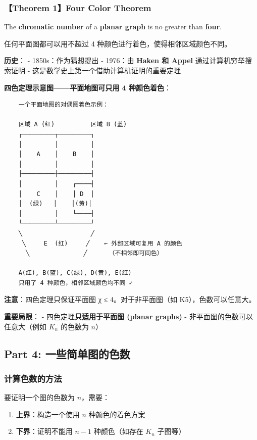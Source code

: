 \documentclass[10pt,a4paper,openany]{ctexbook}
\theoremstyle{definition}
\theoremstyle{remark}
\renewenvironment{quote}
  {\list{}{\leftmargin=1em\rightmargin=0pt\topsep=0.5pt\partopsep=0pt}\item[]}
  {\endlist}
\begin{document}
\subsubsection{【Theorem 1】Four Color Theorem}

\begin{quote}
The \textbf{chromatic number} of a \textbf{planar graph} is no greater than \textbf{four}.

任何平面图都可以用不超过 4 种颜色进行着色，使得相邻区域颜色不同。

\textbf{历史}：
- 1850s：作为猜想提出
- 1976：由 \textbf{Haken 和 Appel} 通过计算机穷举搜索证明
- 这是数学史上第一个借助计算机证明的重要定理

\textbf{四色定理示意图——平面地图可只用 4 种颜色着色}：

{\footnotesize\begin{verbatim}
    一个平面地图的对偶图着色示例：
    
    区域 A (红)          区域 B (蓝)
    ┌─────────┬─────────┐
    │         │         │
    │    A    │    B    │
    │         │         │
    ├─────────┼─────────┤
    │         │    ┌────┤
    │    C    │    │ D  │
    │  (绿)   │    │(黄)│
    │         │    └────┤
    └─────────┴─────────┘
    ╲                   ╱
     ╲     E  (红)     ╱    ← 外部区域可复用 A 的颜色
      ╲               ╱      （不相邻即可同色）
    
    A(红), B(蓝), C(绿), D(黄), E(红)
    只用了 4 种颜色，相邻区域颜色均不同 ✓
\end{verbatim}}


\textbf{注意}：四色定理只保证平面图 χ ≤ 4。对于非平面图（如 K5），色数可以任意大。

\textbf{重要局限}：
- 四色定理\textbf{只适用于平面图 (planar graphs)}
- 非平面图的色数可以任意大（例如 $K_n$ 的色数为 $n$）

\end{quote}
\vspace{-2pt}

\subsection{Part 4: 一些简单图的色数}

\subsubsection{计算色数的方法}

要证明一个图的色数为 $n$，需要：
\begin{enumerate}
\item \textbf{上界}：构造一个使用 $n$ 种颜色的着色方案
\item \textbf{下界}：证明不能用 $n-1$ 种颜色（如存在 $K_n$ 子图等）

\end{enumerate}
\end{document}
